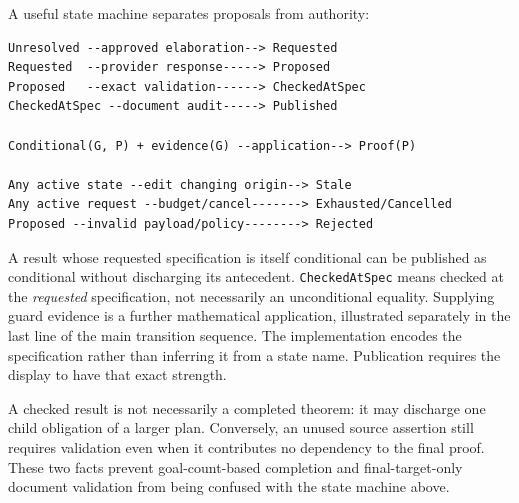 \documentclass[11pt,a4paper]{article}
\newcommand{\code}[1]{\nolinkurl{#1}}
\theoremstyle{definition}
\begin{document}
A useful state machine separates proposals from authority:
\par\noindent\begin{minipage}{\linewidth}
\begin{lstlisting}
Unresolved --approved elaboration--> Requested
Requested  --provider response-----> Proposed
Proposed   --exact validation------> CheckedAtSpec
CheckedAtSpec --document audit-----> Published

Conditional(G, P) + evidence(G) --application--> Proof(P)

Any active state --edit changing origin--> Stale
Any active request --budget/cancel-------> Exhausted/Cancelled
Proposed --invalid payload/policy--------> Rejected
\end{lstlisting}
\end{minipage}\par
A result whose requested specification is itself conditional can be published
as conditional without discharging its antecedent. \code{CheckedAtSpec}
means checked at the \emph{requested} specification, not necessarily an
unconditional equality. Supplying guard evidence is a further mathematical
application, illustrated separately in the last line of the main transition
sequence. The implementation encodes the specification rather than inferring
it from a state name. Publication requires the display to have that exact strength.

A checked result is not necessarily a completed theorem: it may discharge one
child obligation of a larger plan. Conversely, an unused source assertion still
requires validation even when it contributes no dependency to the final proof.
These two facts prevent goal-count-based completion and final-target-only document
validation from being confused with the state machine above.
\end{document}
